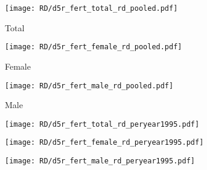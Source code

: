 \documentclass[11pt, a4paper]{scrartcl} %
\begin{document}
\begin{figure}\centering
\begin{subfigure}[h]{0.3\linewidth}\centering
	\caption{Total}
	\texttt{[image: RD/d5r\_fert\_total\_rd\_pooled.pdf]}
\end{subfigure}
\begin{subfigure}[h]{0.3\linewidth}\centering
	\caption{Female}
	\texttt{[image: RD/d5r\_fert\_female\_rd\_pooled.pdf]}
\end{subfigure}
\begin{subfigure}[h]{0.3\linewidth}\centering
	\caption{Male}
	\texttt{[image: RD/d5r\_fert\_male\_rd\_pooled.pdf]}
\end{subfigure}
\begin{subfigure}[h]{0.3\linewidth}\centering
	\texttt{[image: RD/d5r\_fert\_total\_rd\_peryear1995.pdf]}
\end{subfigure}
\begin{subfigure}[h]{0.3\linewidth}\centering
	\texttt{[image: RD/d5r\_fert\_female\_rd\_peryear1995.pdf]}
\end{subfigure}
\begin{subfigure}[h]{0.3\linewidth}\centering
	\texttt{[image: RD/d5r\_fert\_male\_rd\_peryear1995.pdf]}
\end{subfigure}


\end{figure}
\end{document}
